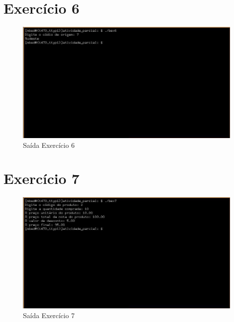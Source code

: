 \documentclass[12pt,a4paper]{article}
\let\oldsection\section
\renewcommand\section{\clearpage\oldsection}
\begin{document}
\section{Exercício 6}

\begin{figure}[htb!]
	\centering
	\includegraphics[width=16cm]{ex6}
	\caption{Saída Exercício 6}
	\label{fig:6}
\end{figure}

\section{Exercício 7}

\begin{figure}[htb!]
	\centering
	\includegraphics[width=16cm]{ex7}
	\caption{Saída Exercício 7}
	\label{fig:7}
\end{figure}
\end{document}
